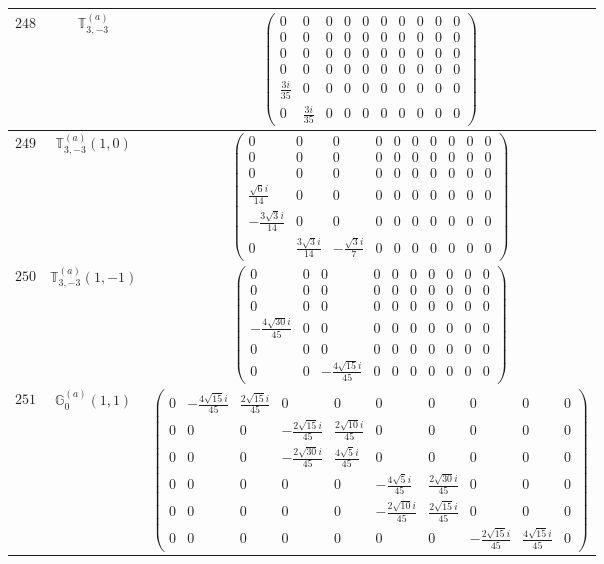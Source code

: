 \documentclass[fleqn,8pt,landscape]{jsarticle}
\begin{document}
\begin{center}
\begin{longtable}{ccc}
$ 248 $ & $ \mathbb{T}_{3,-3}^{(a)} $ & $ \begin{pmatrix} 0 & 0 & 0 & 0 & 0 & 0 & 0 & 0 & 0 & 0 \\ 0 & 0 & 0 & 0 & 0 & 0 & 0 & 0 & 0 & 0 \\ 0 & 0 & 0 & 0 & 0 & 0 & 0 & 0 & 0 & 0 \\ 0 & 0 & 0 & 0 & 0 & 0 & 0 & 0 & 0 & 0 \\ \frac{3 i}{35} & 0 & 0 & 0 & 0 & 0 & 0 & 0 & 0 & 0 \\ 0 & \frac{3 i}{35} & 0 & 0 & 0 & 0 & 0 & 0 & 0 & 0 \end{pmatrix} $ \\ \hline
$ 249 $ & $ \mathbb{T}_{3,-3}^{(a)}(1,0) $ & $ \begin{pmatrix} 0 & 0 & 0 & 0 & 0 & 0 & 0 & 0 & 0 & 0 \\ 0 & 0 & 0 & 0 & 0 & 0 & 0 & 0 & 0 & 0 \\ 0 & 0 & 0 & 0 & 0 & 0 & 0 & 0 & 0 & 0 \\ \frac{\sqrt{6} i}{14} & 0 & 0 & 0 & 0 & 0 & 0 & 0 & 0 & 0 \\ - \frac{3 \sqrt{3} i}{14} & 0 & 0 & 0 & 0 & 0 & 0 & 0 & 0 & 0 \\ 0 & \frac{3 \sqrt{3} i}{14} & - \frac{\sqrt{3} i}{7} & 0 & 0 & 0 & 0 & 0 & 0 & 0 \end{pmatrix} $ \\ \hline
$ 250 $ & $ \mathbb{T}_{3,-3}^{(a)}(1,-1) $ & $ \begin{pmatrix} 0 & 0 & 0 & 0 & 0 & 0 & 0 & 0 & 0 & 0 \\ 0 & 0 & 0 & 0 & 0 & 0 & 0 & 0 & 0 & 0 \\ 0 & 0 & 0 & 0 & 0 & 0 & 0 & 0 & 0 & 0 \\ - \frac{4 \sqrt{30} i}{45} & 0 & 0 & 0 & 0 & 0 & 0 & 0 & 0 & 0 \\ 0 & 0 & 0 & 0 & 0 & 0 & 0 & 0 & 0 & 0 \\ 0 & 0 & - \frac{4 \sqrt{15} i}{45} & 0 & 0 & 0 & 0 & 0 & 0 & 0 \end{pmatrix} $ \\ \hline
$ 251 $ & $ \mathbb{G}_{0}^{(a)}(1,1) $ & $ \begin{pmatrix} 0 & - \frac{4 \sqrt{15} i}{45} & \frac{2 \sqrt{15} i}{45} & 0 & 0 & 0 & 0 & 0 & 0 & 0 \\ 0 & 0 & 0 & - \frac{2 \sqrt{15} i}{45} & \frac{2 \sqrt{10} i}{45} & 0 & 0 & 0 & 0 & 0 \\ 0 & 0 & 0 & - \frac{2 \sqrt{30} i}{45} & \frac{4 \sqrt{5} i}{45} & 0 & 0 & 0 & 0 & 0 \\ 0 & 0 & 0 & 0 & 0 & - \frac{4 \sqrt{5} i}{45} & \frac{2 \sqrt{30} i}{45} & 0 & 0 & 0 \\ 0 & 0 & 0 & 0 & 0 & - \frac{2 \sqrt{10} i}{45} & \frac{2 \sqrt{15} i}{45} & 0 & 0 & 0 \\ 0 & 0 & 0 & 0 & 0 & 0 & 0 & - \frac{2 \sqrt{15} i}{45} & \frac{4 \sqrt{15} i}{45} & 0 \end{pmatrix} $ \\ \hline

\end{longtable}
\end{center}
\end{document}
